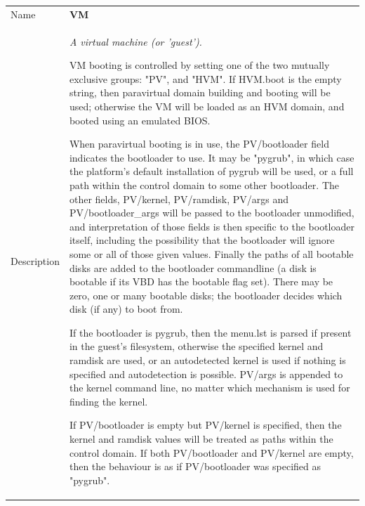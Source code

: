 \begin{longtable}{|lllp{}|}
\hline
\multicolumn{1}{|l}{Name} & \multicolumn{3}{l|}{\bf VM} \\
\multicolumn{1}{|l}{Description} & \multicolumn{3}{l|}{\parbox{11cm}{\em A virtual machine (or 'guest').

VM booting is controlled by setting one of the two mutually exclusive
groups: "PV", and "HVM".  If HVM.boot is the empty string, then paravirtual
domain building and booting will be used; otherwise the VM will be loaded
as an HVM domain, and booted using an emulated BIOS.

When paravirtual booting is in use, the PV/bootloader field indicates the
bootloader to use.  It may be "pygrub", in which case the platform's
default installation of pygrub will be used, or a full path within the
control domain to some other bootloader.  The other fields, PV/kernel,
PV/ramdisk, PV/args and PV/bootloader\_args will be passed to the
bootloader unmodified, and interpretation of those fields is then specific
to the bootloader itself, including the possibility that the bootloader
will ignore some or all of those given values. Finally the paths of all
bootable disks are added to the bootloader commandline (a disk is bootable
if its VBD has the bootable flag set). There may be zero, one or many
bootable disks; the bootloader decides which disk (if any) to boot from.

If the bootloader is pygrub, then the menu.lst is parsed if present in the
guest's filesystem, otherwise the specified kernel and ramdisk are used, or
an autodetected kernel is used if nothing is specified and autodetection is
possible.  PV/args is appended to the kernel command line, no matter which
mechanism is used for finding the kernel.

If PV/bootloader is empty but PV/kernel is specified, then the kernel and
ramdisk values will be treated as paths within the control domain.  If both
PV/bootloader and PV/kernel are empty, then the behaviour is as if
PV/bootloader was specified as "pygrub".

}}
\end{longtable}
